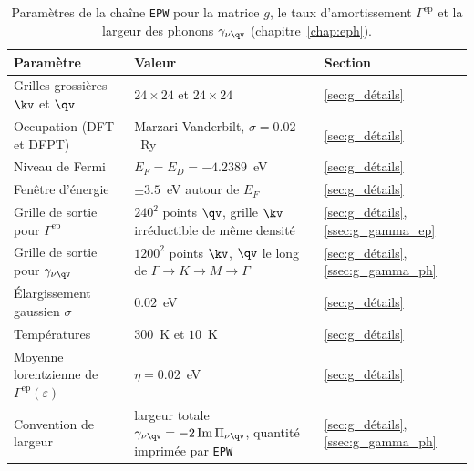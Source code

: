 \begin{table}[htbp]
    \centering
    \caption[Paramètres de la chaîne \texttt{EPW}.]{Paramètres de la chaîne \texttt{EPW} pour la matrice $g$, le taux d'amortissement $\Gamma^\text{ep}$ et la largeur des phonons $\gamma_{\nu\qv}$ (chapitre~\ref{chap:eph}).}
    \label{tab:param_epw}
    \small
    \setlength{\tabcolsep}{4pt}
    \begin{tabular}{p{} p{} p{}}
        \hline\hline
        Paramètre & Valeur & Section \\
        \hline
        Grilles grossières $\kv$ et $\qv$ & $24\times 24$ et $24\times 24$ & \ref{sec:g_détails} \\
        Occupation (DFT et DFPT) & Marzari-Vanderbilt, $\sigma = 0.02$~Ry & \ref{sec:g_détails} \\
        Niveau de Fermi & $E_F = E_D = -4.2389$~eV & \ref{sec:g_détails} \\
        Fenêtre d'énergie & $\pm 3.5$~eV autour de $E_F$ & \ref{sec:g_détails} \\
        Grille de sortie pour $\Gamma^\text{ep}$ & $240^2$ points $\qv$, grille $\kv$ irréductible de même densité & \ref{sec:g_détails}, \ref{ssec:g_gamma_ep} \\
        Grille de sortie pour $\gamma_{\nu\qv}$ & $1200^2$ points $\kv$, $\qv$ le long de $\Gamma\to K\to M\to\Gamma$ & \ref{sec:g_détails}, \ref{ssec:g_gamma_ph} \\
        Élargissement gaussien $\sigma$ & $0.02$~eV & \ref{sec:g_détails} \\
        Températures & $300$~K et $10$~K & \ref{sec:g_détails} \\
        Moyenne lorentzienne de $\Gamma^\text{ep}(\varepsilon)$ & $\eta = 0.02$~eV & \ref{sec:g_détails} \\
        Convention de largeur & largeur totale $\gamma_{\nu\qv} = -2\,\mathrm{Im}\,\Pi_{\nu\qv}$, quantité imprimée par \texttt{EPW} & \ref{sec:g_détails}, \ref{ssec:g_gamma_ph} \\
        \hline\hline
    \end{tabular}
\end{table}

